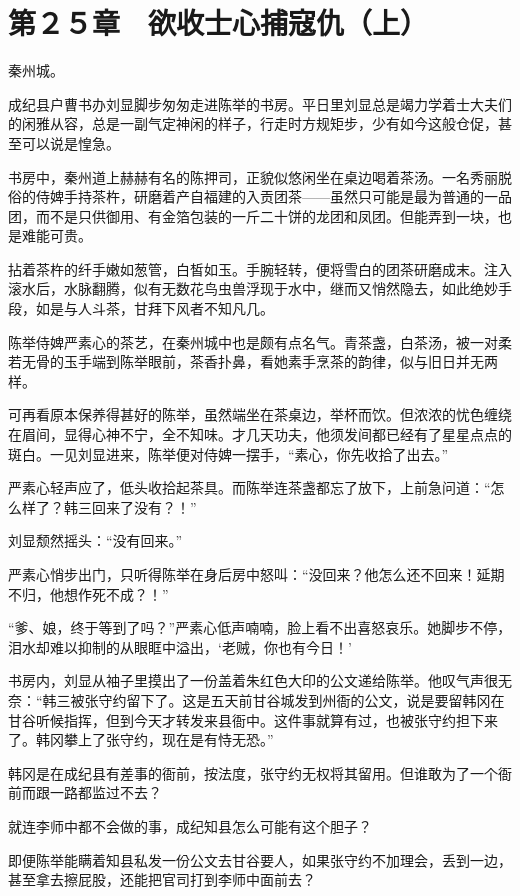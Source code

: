 \section{第２５章　欲收士心捕寇仇（上）}

秦州城。

成纪县户曹书办刘显脚步匆匆走进陈举的书房。平日里刘显总是竭力学着士大夫们的闲雅从容，总是一副气定神闲的样子，行走时方规矩步，少有如今这般仓促，甚至可以说是惶急。

书房中，秦州道上赫赫有名的陈押司，正貌似悠闲坐在桌边喝着茶汤。一名秀丽脱俗的侍婢手持茶杵，研磨着产自福建的入贡团茶——虽然只可能是最为普通的一品团，而不是只供御用、有金箔包装的一斤二十饼的龙团和凤团。但能弄到一块，也是难能可贵。

拈着茶杵的纤手嫩如葱管，白皙如玉。手腕轻转，便将雪白的团茶研磨成末。注入滚水后，水脉翻腾，似有无数花鸟虫兽浮现于水中，继而又悄然隐去，如此绝妙手段，如是与人斗茶，甘拜下风者不知凡几。

陈举侍婢严素心的茶艺，在秦州城中也是颇有点名气。青茶盏，白茶汤，被一对柔若无骨的玉手端到陈举眼前，茶香扑鼻，看她素手烹茶的韵律，似与旧日并无两样。

可再看原本保养得甚好的陈举，虽然端坐在茶桌边，举杯而饮。但浓浓的忧色缠绕在眉间，显得心神不宁，全不知味。才几天功夫，他须发间都已经有了星星点点的斑白。一见刘显进来，陈举便对侍婢一摆手，“素心，你先收拾了出去。”

严素心轻声应了，低头收拾起茶具。而陈举连茶盏都忘了放下，上前急问道：“怎么样了？韩三回来了没有？！”

刘显颓然摇头：“没有回来。”

严素心悄步出门，只听得陈举在身后房中怒叫：“没回来？他怎么还不回来！延期不归，他想作死不成？！”

“爹、娘，终于等到了吗？”严素心低声喃喃，脸上看不出喜怒哀乐。她脚步不停，泪水却难以抑制的从眼眶中溢出，‘老贼，你也有今日！’

书房内，刘显从袖子里摸出了一份盖着朱红色大印的公文递给陈举。他叹气声很无奈：“韩三被张守约留下了。这是五天前甘谷城发到州衙的公文，说是要留韩冈在甘谷听候指挥，但到今天才转发来县衙中。这件事就算有过，也被张守约担下来了。韩冈攀上了张守约，现在是有恃无恐。”

韩冈是在成纪县有差事的衙前，按法度，张守约无权将其留用。但谁敢为了一个衙前而跟一路都监过不去？

就连李师中都不会做的事，成纪知县怎么可能有这个胆子？

即便陈举能瞒着知县私发一份公文去甘谷要人，如果张守约不加理会，丢到一边，甚至拿去擦屁股，还能把官司打到李师中面前去？

